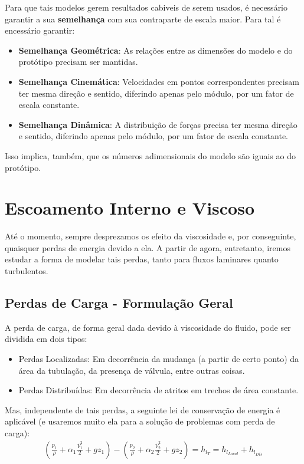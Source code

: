 \documentclass{article}
\begin{document}
Para que tais modelos gerem resultados cabiveis de serem usados, é necessário garantir a sua \textbf{semelhança} com sua contraparte de escala maior. Para tal é encessário garantir:
\begin{itemize}
    \item \textbf{Semelhança Geométrica}: As relações entre as dimensões do modelo e do protótipo precisam ser mantidas.
    \item \textbf{Semelhança Cinemática}: Velocidades em pontos correspondentes precisam ter mesma direção e sentido, diferindo apenas pelo módulo, por um fator de escala constante.
    \item \textbf{Semelhança Dinâmica}: A distribuição de forças precisa ter mesma direção e sentido, diferindo apenas pelo módulo, por um fator de escala constante.
\end{itemize}

Isso implica, também, que os números adimensionais do modelo são iguais ao do protótipo.

\newpage
\section{Escoamento Interno e Viscoso}
Até o momento, sempre desprezamos os efeito da viscosidade e, por conseguinte, quaisquer perdas de energia devido a ela. A partir de agora, entretanto, iremos estudar a forma de modelar tais perdas, tanto para fluxos laminares quanto turbulentos.

\subsection{Perdas de Carga - Formulação Geral}
A perda de carga, de forma geral dada devido à viscosidade do fluido, pode ser dividida em dois tipos:
\begin{itemize}
    \item Perdas Localizadas: Em decorrência da mudança (a partir de certo ponto) da área da tubulação, da presença de válvula, entre outras coisas.
    \item Perdas Distribuídas: Em decorrência de atritos em trechos de área constante.
\end{itemize}

Mas, independente de tais perdas, a seguinte lei de conservação de energia é aplicável (e usaremos muito ela para a solução de problemas com perda de carga):
\begin{align}
    \left(\frac{p_1}{\rho} + \alpha_1 \frac{\bar{V}^2_1}{2} + gz_1\right) - \left(\frac{p_2}{\rho} + \alpha_2 \frac{\bar{V}^2_2}{2} + gz_2\right) = h_{l_{T}} = h_{l_{Local}} + h_{l_{Dis}}
\end{align}
\end{document}
